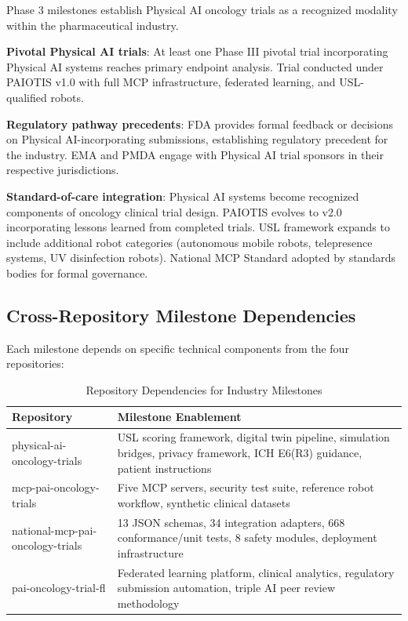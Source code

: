 \documentclass[11pt,letterpaper]{article}
\begin{document}
Phase 3 milestones establish Physical AI oncology trials as a recognized modality within the pharmaceutical industry.

\begin{description}[leftmargin=3.5cm, style=sameline]
  \item[2028 H1] \textbf{Pivotal Physical AI trials}: At least one Phase III pivotal trial incorporating Physical AI systems reaches primary endpoint analysis. Trial conducted under PAIOTIS v1.0 with full MCP infrastructure, federated learning, and USL-qualified robots.

  \item[2028 H2] \textbf{Regulatory pathway precedents}: FDA provides formal feedback or decisions on Physical AI-incorporating submissions, establishing regulatory precedent for the industry. EMA and PMDA engage with Physical AI trial sponsors in their respective jurisdictions.

  \item[2029+] \textbf{Standard-of-care integration}: Physical AI systems become recognized components of oncology clinical trial design. PAIOTIS evolves to v2.0 incorporating lessons learned from completed trials. USL framework expands to include additional robot categories (autonomous mobile robots, telepresence systems, UV disinfection robots). National MCP Standard adopted by standards bodies for formal governance.
\end{description}

\subsection{Cross-Repository Milestone Dependencies}

Each milestone depends on specific technical components from the four repositories:

\begin{table}[H]
\centering
\caption{Repository Dependencies for Industry Milestones}
\small
\begin{tabularx}{\textwidth}{l X}
\toprule
\textbf{Repository} & \textbf{Milestone Enablement} \\
\midrule
physical-ai-oncology-trials \cite{kawchak2026repo} & USL scoring framework, digital twin pipeline, simulation bridges, privacy framework, ICH E6(R3) guidance, patient instructions \\
mcp-pai-oncology-trials \cite{kawchak2026mcp} & Five MCP servers, security test suite, reference robot workflow, synthetic clinical datasets \\
national-mcp-pai-oncology-trials \cite{kawchak2026nationalmcp} & 13 JSON schemas, 34 integration adapters, 668 conformance/unit tests, 8 safety modules, deployment infrastructure \\
pai-oncology-trial-fl \cite{kawchak2026fl} & Federated learning platform, clinical analytics, regulatory submission automation, triple AI peer review methodology \\
\bottomrule
\end{tabularx}
\end{table}
\end{document}
